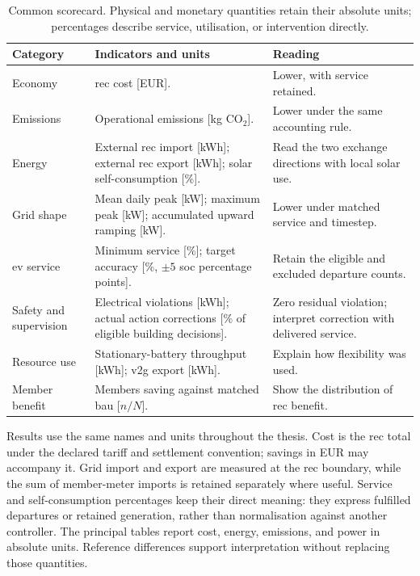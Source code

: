 \begin{table}[!htbp]
\centering
\caption{Common scorecard. Physical and monetary quantities retain their absolute units; percentages describe service, utilisation, or intervention directly.}
\label{tab:sim-core-scorecard}
\footnotesize
\setlength{\tabcolsep}{4pt}
\renewcommand{\arraystretch}{1.16}
\begin{tabularx}{\textwidth}{@{}>{\raggedright\arraybackslash}p{}>{\raggedright\arraybackslash}X >{\raggedright\arraybackslash}p{}@{}}
\toprule
\textbf{Category} & \textbf{Indicators and units} & \textbf{Reading} \\
\midrule
Economy & \gls{rec} cost [EUR]. & Lower, with service retained. \\
Emissions & Operational emissions [kg CO$_2$]. & Lower under the same accounting rule. \\
Energy & External \gls{rec} import [kWh]; external \gls{rec} export [kWh]; solar self-consumption [\%]. & Read the two exchange directions with local solar use. \\
Grid shape & Mean daily peak [kW]; maximum peak [kW]; accumulated upward ramping [kW]. & Lower under matched service and timestep. \\
\gls{ev} service & Minimum service [\%]; target accuracy [\%, $\pm5$ \gls{soc} percentage points]. & Retain the eligible and excluded departure counts. \\
Safety and supervision & Electrical violations [kWh]; actual action corrections [\% of eligible building decisions]. & Zero residual violation; interpret correction with delivered service. \\
Resource use & Stationary-battery throughput [kWh]; \gls{v2g} export [kWh]. & Explain how flexibility was used. \\
Member benefit & Members saving against matched \gls{bau} [$n/N$]. & Show the distribution of \gls{rec} benefit. \\
\bottomrule
\end{tabularx}
\end{table}

Results use the same names and units throughout the thesis. Cost is the \gls{rec} total under the declared tariff and settlement convention; savings in EUR may accompany it. Grid import and export are measured at the \gls{rec} boundary, while the sum of member-meter imports is retained separately where useful. Service and self-consumption percentages keep their direct meaning: they express fulfilled departures or retained generation, rather than normalisation against another controller. The principal tables report cost, energy, emissions, and power in absolute units. Reference differences support interpretation without replacing those quantities.

